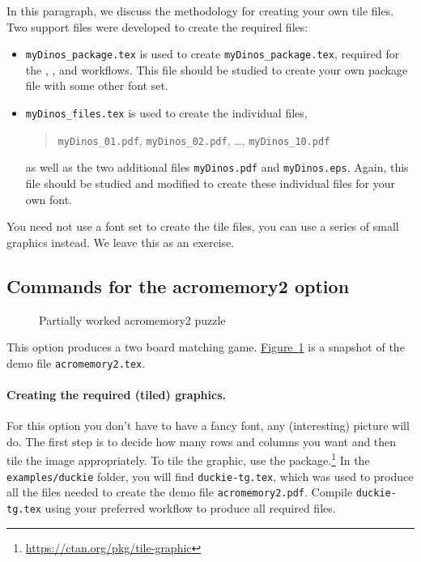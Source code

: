 \documentclass{article}
\begin{document}
In this paragraph, we discuss the methodology for creating your own tile files.
Two support files were developed to create the required files:
\begin{itemize}
  \item \texttt{myDinos\_package.tex} is used to create
      \texttt{myDinos\_package.tex}, required for the ,
      , and  workflows. This file
      should be studied to create your own package file with some other font
      set.
  \item \texttt{myDinos\_files.tex} is used to create the individual files,
      \begin{quote}\texttt{myDinos\_01.pdf}, \texttt{myDinos\_02.pdf}, \dots,
      \texttt{myDinos\_10.pdf}\end{quote} as well as the two additional files
      \texttt{myDinos.pdf} and \texttt{myDinos.eps}. Again, this file should
      be studied and modified to create these individual files for your own
      font.
\end{itemize}
You need not use a font set to create the tile files, you can use a series of
small graphics instead. We leave this as an exercise.

\subsection{Commands for the \textsf{acromemory2} option}

\begin{figure}[htb]\centering{}
\caption{Partially worked \textsf{acromemory2} puzzle}\label{fig:am2}
\end{figure}


\noindent This option produces a two board matching game.
\hyperref[fig:am2]{Figure~\ref*{fig:am2}} is a snapshot of the
demo file \texttt{acromemory2.tex}.
\paragraph*{Creating the required (tiled) graphics.} For this option you don't have to have a fancy font, any (interesting)
picture will do. The first step is to decide how many rows and columns you
want and then tile the image appropriately. To tile the graphic, use the
 package.\footnote{\url{https://ctan.org/pkg/tile-graphic}}
In the \texttt{examples/duckie} folder, you will find \texttt{duckie-tg.tex},
which was used to produce all the files needed to create the demo file
\texttt{acromemory2.pdf}. Compile \texttt{duckie-tg.tex} using your preferred
workflow to produce all required files.
\end{document}
